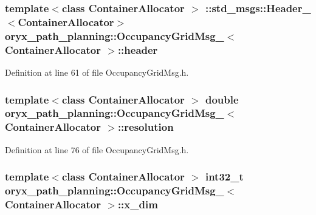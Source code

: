 \subsubsection[{header}]{\setlength{\rightskip}{0pt plus 5cm}template$<$class Container\-Allocator $>$ \-::std\-\_\-msgs\-::\-Header\-\_\-$<$\-Container\-Allocator$>$ {\bf oryx\-\_\-path\-\_\-planning\-::\-Occupancy\-Grid\-Msg\-\_\-}$<$ \-Container\-Allocator $>$\-::{\bf header}}\label{structoryx__path__planning_1_1OccupancyGridMsg___a915367aae5d3ae5f7e973d7b92bcef69}


\-Definition at line 61 of file \-Occupancy\-Grid\-Msg.\-h.

\subsubsection[{resolution}]{\setlength{\rightskip}{0pt plus 5cm}template$<$class Container\-Allocator $>$ double {\bf oryx\-\_\-path\-\_\-planning\-::\-Occupancy\-Grid\-Msg\-\_\-}$<$ \-Container\-Allocator $>$\-::{\bf resolution}}\label{structoryx__path__planning_1_1OccupancyGridMsg___a81d78b0735542f3d13940ab1028d9cf8}


\-Definition at line 76 of file \-Occupancy\-Grid\-Msg.\-h.

\subsubsection[{x\-\_\-dim}]{\setlength{\rightskip}{0pt plus 5cm}template$<$class Container\-Allocator $>$ int32\-\_\-t {\bf oryx\-\_\-path\-\_\-planning\-::\-Occupancy\-Grid\-Msg\-\_\-}$<$ \-Container\-Allocator $>$\-::{\bf x\-\_\-dim}}\label{structoryx__path__planning_1_1OccupancyGridMsg___a20ddf478e9d9e2a20b6df3e77d83df4f}


